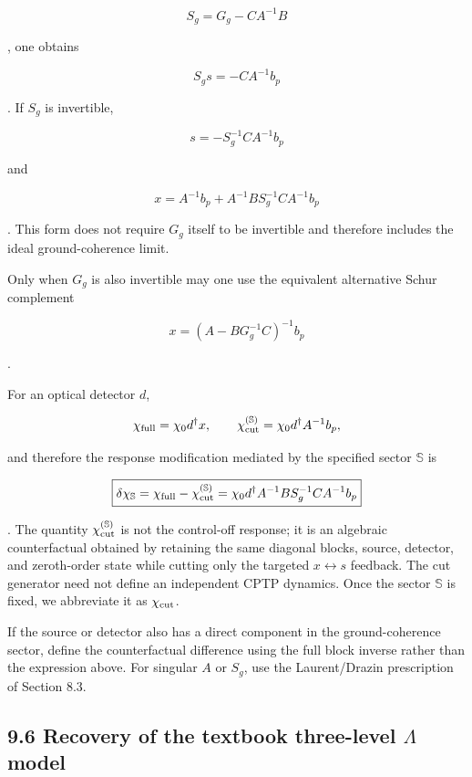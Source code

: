 \documentclass[
  10pt,
  a4paper,
]{article}
\begin{document}
\[
\boxed{
S_g=G_g-CA^{-1}B
}
\]

, one obtains

\[
S_gs=-CA^{-1}b_p
\]

. If \(S_g\) is invertible,

\[
\boxed{
s=-S_g^{-1}CA^{-1}b_p
}
\]

and

\[
\boxed{
x=A^{-1}b_p
+A^{-1}BS_g^{-1}CA^{-1}b_p
}
\]

. This form does not require \(G_g\) itself to be invertible and
therefore includes the ideal ground-coherence limit.

Only when \(G_g\) is also invertible may one use the equivalent
alternative Schur complement

\[
\boxed{
x=(A-BG_g^{-1}C)^{-1}b_p
}
\]

.

For an optical detector \(d\),

\[
\chi_{\rm full}
=\chi_0d^\dagger x,
\qquad
\chi_{\rm cut}^{(\mathbb S)}
=\chi_0d^\dagger A^{-1}b_p,
\]

and therefore the response modification mediated by the specified sector
\(\mathbb S\) is

\[
\boxed{
\delta\chi_{\mathbb S}
=\chi_{\rm full}-\chi_{\rm cut}^{(\mathbb S)}
=\chi_0d^\dagger A^{-1}B
S_g^{-1}CA^{-1}b_p
}
\]

. The quantity \(\chi_{\rm cut}^{(\mathbb S)}\) is not the control-off
response; it is an algebraic counterfactual obtained by retaining the
same diagonal blocks, source, detector, and zeroth-order state while
cutting only the targeted \(x\leftrightarrow s\) feedback. The cut
generator need not define an independent CPTP dynamics. Once the sector
\(\mathbb S\) is fixed, we abbreviate it as \(\chi_{\rm cut}\).

If the source or detector also has a direct component in the
ground-coherence sector, define the counterfactual difference using the
full block inverse rather than the expression above. For singular \(A\)
or \(S_g\), use the Laurent/Drazin prescription of Section 8.3.

\subsection{\texorpdfstring{9.6 Recovery of the textbook three-level
\(\Lambda\)
model}{9.6 Recovery of the textbook three-level \textbackslash Lambda model}}\label{recovery-of-the-textbook-three-level-lambda-model}
\end{document}
